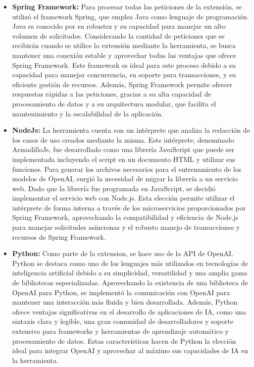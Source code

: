 \begin{itemize}
	\item \textbf{Spring Framework:} Para procesar todas las peticiones de la extensión, se utilizó el framework Spring, que emplea Java como lenguaje de programación. Java es conocido por su robustez y su capacidad para manejar un alto volumen de solicitudes. Considerando la cantidad de peticiones que se recibirán cuando se utilice la extensión mediante la herramienta, se busca mantener una conexión estable y aprovechar todas las ventajas que ofrece Spring Framework. Este framework es ideal para este proceso debido a su capacidad para manejar concurrencia, su soporte para transacciones, y su eficiente gestión de recursos. Además, Spring Framework permite ofrecer respuestas rápidas a las peticiones, gracias a su alta capacidad de procesamiento de datos y a su arquitectura modular, que facilita el mantenimiento y la escalabilidad de la aplicación.
	
	\item \textbf{NodeJs:} La herramienta cuenta con un intérprete que analiza la redacción de los casos de uso creados mediante la misma. Este intérprete, denominado ArmadilloJs, fue desarrollado como una librería JavaScript que puede ser implementada incluyendo el script en un documento HTML y utilizar sus funciones. Para generar los archivos necesarios para el entrenamiento de los modelos de OpenAI, surgió la necesidad de migrar la librería a un servicio web. Dado que la librería fue programada en JavaScript, se decidió implementar el servicio web con Node.js. Esta elección permite utilizar el intérprete de forma interna a través de los microservicios proporcionados por Spring Framework, aprovechando la compatibilidad y eficiencia de Node.js para manejar solicitudes asíncronas y el robusto manejo de transacciones y recursos de Spring Framework.
	
	\item \textbf{Python:} Como parte de la extension, se hace uso de la API de OpenAI. Python se destaca como uno de los lenguajes más utilizados en tecnologías de inteligencia artificial debido a su simplicidad, versatilidad y una amplia gama de bibliotecas especializadas. Aprovechando la existencia de una biblioteca de OpenAI para Python, se implementó la comunicación con OpenAI para mantener una interacción más fluida y bien desarrollada. Además, Python ofrece ventajas significativas en el desarrollo de aplicaciones de IA, como una sintaxis clara y legible, una gran comunidad de desarrolladores y soporte extensivo para frameworks y herramientas de aprendizaje automático y procesamiento de datos. Estas características hacen de Python la elección ideal para integrar OpenAI y aprovechar al máximo sus capacidades de IA en la herramienta.
	
\end{itemize}

